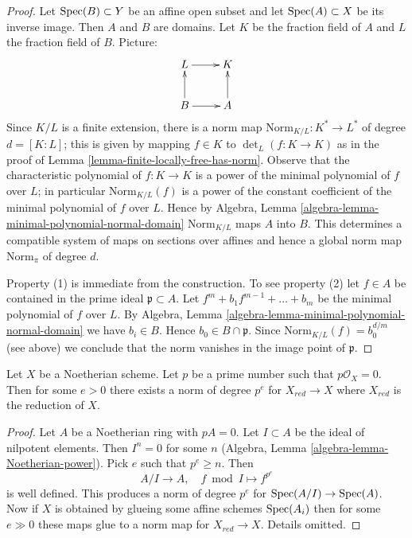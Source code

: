 \begin{proof}
Let $\mathop{\mathrm{Spec}}(B) \subset Y$ be an affine open subset and let
$\mathop{\mathrm{Spec}}(A) \subset X$ be its inverse image. Then $A$ and $B$
are domains. Let $K$ be the fraction
field of $A$ and $L$ the fraction field of $B$. Picture:
$$
\xymatrix{
L \ar[r] & K \\
B \ar[u] \ar[r] & A \ar[u]
}
$$
Since $K/L$ is a finite extension, there is a norm map
$\text{Norm}_{K/L} : K^* \to L^*$ of degree $d = [K : L]$; this is given by
mapping $f \in K$ to $\det_L(f : K \to K)$ as in the proof
of Lemma \ref{lemma-finite-locally-free-has-norm}.
Observe that the characteristic polynomial of $f : K \to K$
is a power of the minimal polynomial of $f$ over $L$;
in particular $\text{Norm}_{K/L}(f)$ is a power of the constant
coefficient of the minimal polynomial of $f$ over $L$. Hence by
Algebra, Lemma \ref{algebra-lemma-minimal-polynomial-normal-domain}
$\text{Norm}_{K/L}$ maps $A$ into $B$.
This determines a compatible system of maps
on sections over affines and hence a global norm map
$\text{Norm}_\pi$ of degree $d$.

\medskip\noindent
Property (1) is immediate from the construction.
To see property (2) let $f \in A$ be contained in the
prime ideal $\mathfrak p \subset A$. Let
$f^m + b_1 f^{m - 1} + \ldots + b_m$ be the minimal
polynomial of $f$ over $L$. By
Algebra, Lemma \ref{algebra-lemma-minimal-polynomial-normal-domain}
we have $b_i \in B$. Hence $b_0 \in B \cap \mathfrak p$.
Since $\text{Norm}_{K/L}(f) = b_0^{d/m}$ (see above)
we conclude that the norm vanishes in the image point of $\mathfrak p$.
\end{proof}

\begin{lemma}
\label{lemma-Frobenius-gives-norm-for-reduction}
Let $X$ be a Noetherian scheme. Let $p$ be a prime number such that
$p\mathcal{O}_X = 0$. Then for some $e > 0$ there exists a norm
of degree $p^e$ for $X_{red} \to X$ where $X_{red}$ is the reduction
of $X$.
\end{lemma}

\begin{proof}
Let $A$ be a Noetherian ring with $pA = 0$. Let $I \subset A$ be the
ideal of nilpotent elements. Then $I^n = 0$ for some $n$ (Algebra,
Lemma \ref{algebra-lemma-Noetherian-power}).
Pick $e$ such that $p^e \geq n$. Then
$$
A/I \longrightarrow A,\quad
f \bmod I \longmapsto f^{p^e}
$$
is well defined. This produces a norm of degree $p^e$ for
$\mathop{\mathrm{Spec}}(A/I) \to \mathop{\mathrm{Spec}}(A)$. Now if $X$ is obtained by glueing some
affine schemes $\mathop{\mathrm{Spec}}(A_i)$ then for some $e \gg 0$ these maps
glue to a norm map for $X_{red} \to X$. Details omitted.
\end{proof}

